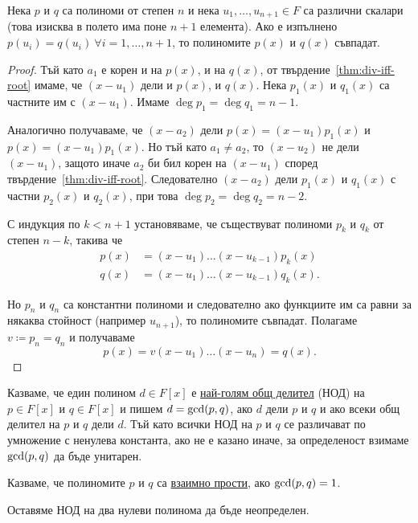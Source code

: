\documentclass[numbers=endperiod, DIV=15]{scrartcl}
\begin{document}
\begin{theorem}\label{thm:coeff-principle}
  Нека $p$ и $q$ са полиноми от степен $n$ и нека $u_1, \ldots, u_{n+1} \in F$ са различни скалари (това изисква в полето има поне $n+1$ елемента). Ако е изпълнено $p(u_i) = q(u_i)~\forall i = 1, \ldots, n + 1$, то полиномите $p(x)$ и $q(x)$ съвпадат.
\end{theorem}
\begin{proof}
  Тъй като $a_1$ е корен и на $p(x)$, и на $q(x)$, от твърдение~\ref{thm:div-iff-root} имаме, че $(x - u_1)$ дели и $p(x)$, и $q(x)$. Нека $p_1(x)$ и $q_1(x)$ са частните им с $(x - u_1)$. Имаме $\deg p_1 = \deg q_1 = n - 1$.

  Аналогично получаваме, че $(x - a_2)$ дели $p(x) = (x - u_1) p_1(x)$ и $p(x) = (x - u_1) p_1(x)$. Но тъй като $a_1 \neq a_2$, то $(x - u_2)$ не дели $(x - u_1)$, защото иначе $a_2$ би бил корен на $(x - u_1)$ според твърдение~\ref{thm:div-iff-root}. Следователно $(x - a_2)$ дели $p_1(x)$ и $q_1(x)$ с частни $p_2(x)$ и $q_2(x)$, при това $\deg p_2 = \deg q_2 = n - 2$.

  С индукция по $k < n + 1$ установяваме, че съществуват полиноми $p_k$ и $q_k$ от степен $n - k$, такива че
  \begin{align*}
    p(x) &= (x - u_1) \ldots (x - u_{k-1}) p_k(x) \\
    q(x) &= (x - u_1) \ldots (x - u_{k-1}) q_k(x).
  \end{align*}

  Но $p_n$ и $q_n$ са константни полиноми и следователно ако функциите им са равни за някаква стойност (например $u_{n+1}$), то полиномите съвпадат. Полагаме $v \coloneqq p_n = q_n$ и получаваме
  \begin{displaymath}
    p(x) = v (x - u_1) \ldots (x - u_n) = q(x).
  \end{displaymath}
\end{proof}

\begin{definition}
  Казваме, че един полином $d \in F[x]$ е \underline{най-голям общ делител} (НОД) на $p \in F[x]$ и $q \in F[x]$ и пишем $d = \operatorname{gcd}(p, q)$, ако $d$ дели $p$ и $q$ и ако всеки общ делител на $p$ и $q$ дели $d$. Тъй като всички НОД на $p$ и $q$ се различават по умножение с ненулева константа, ако не е казано иначе, за определеност взимаме $\operatorname{gcd}(p, q)$ да бъде унитарен.

  Казваме, че полиномите $p$ и $q$ са \underline{взаимно прости}, ако $\operatorname{gcd}(p, q) = 1$.

  Оставяме НОД на два нулеви полинома да бъде неопределен.
\end{definition}
\end{document}
